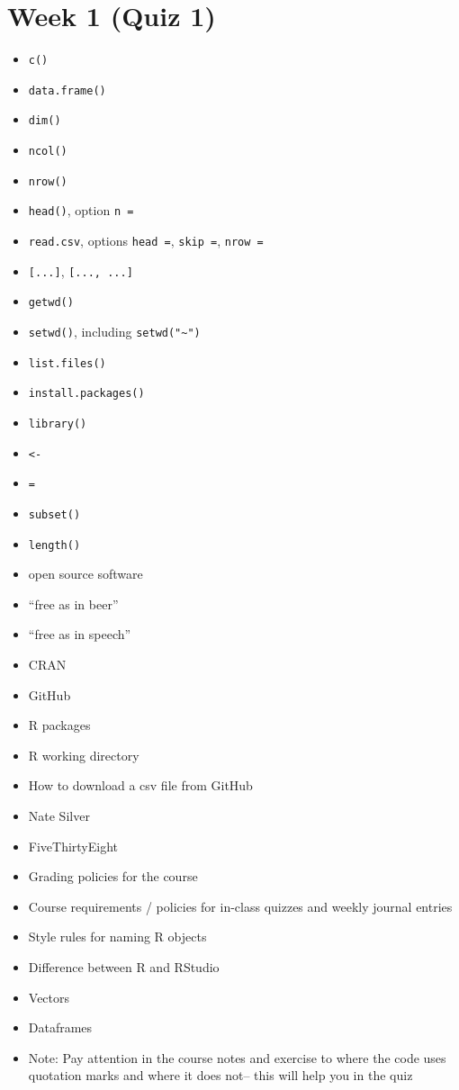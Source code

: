 \documentclass[]{book}
\providecommand{\tightlist}{%
  \setlength{\itemsep}{0pt}\setlength{\parskip}{0pt}}
\begin{document}
\section{Week 1 (Quiz 1)}\label{week-1-quiz-1}

\begin{itemize}
\tightlist
\item
  \texttt{c()}
\item
  \texttt{data.frame()}
\item
  \texttt{dim()}
\item
  \texttt{ncol()}
\item
  \texttt{nrow()}
\item
  \texttt{head()}, option \texttt{n\ =}
\item
  \texttt{read.csv}, options \texttt{head\ =}, \texttt{skip\ =},
  \texttt{nrow\ =}
\item
  \texttt{{[}...{]}}, \texttt{{[}...,\ ...{]}}
\item
  \texttt{getwd()}
\item
  \texttt{setwd()}, including \texttt{setwd("\textasciitilde{}")}
\item
  \texttt{list.files()}
\item
  \texttt{install.packages()}
\item
  \texttt{library()}
\item
  \texttt{\textless{}-}
\item
  \texttt{=}
\item
  \texttt{subset()}
\item
  \texttt{length()}
\item
  open source software
\item
  ``free as in beer''
\item
  ``free as in speech''
\item
  CRAN
\item
  GitHub
\item
  R packages
\item
  R working directory
\item
  How to download a csv file from GitHub
\item
  Nate Silver
\item
  FiveThirtyEight
\item
  Grading policies for the course
\item
  Course requirements / policies for in-class quizzes and weekly journal
  entries
\item
  Style rules for naming R objects
\item
  Difference between R and RStudio
\item
  Vectors
\item
  Dataframes
\item
  Note: Pay attention in the course notes and exercise to where the code
  uses quotation marks and where it does not-- this will help you in the
  quiz
\end{itemize}
\end{document}
